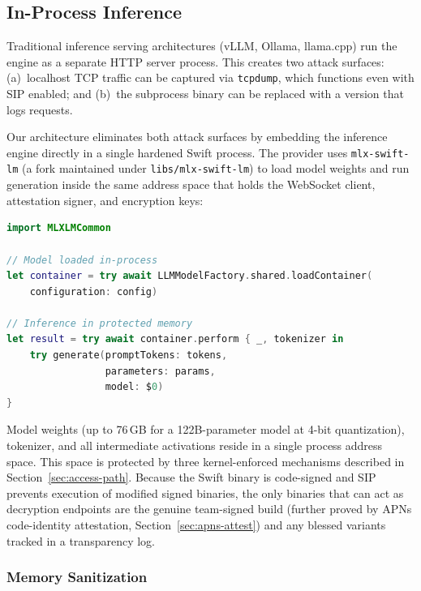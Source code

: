 \documentclass[10pt,twocolumn,letterpaper]{article}
\begin{document}
\subsection{In-Process Inference}
\label{sec:inprocess}

Traditional inference serving architectures (vLLM, Ollama, llama.cpp) run the engine as a separate HTTP server process. This creates two attack surfaces: (a)~localhost TCP traffic can be captured via \texttt{tcpdump}, which functions even with SIP enabled; and (b)~the subprocess binary can be replaced with a version that logs requests.

Our architecture eliminates both attack surfaces by embedding the inference engine directly in a single hardened Swift process. The provider uses \texttt{mlx-swift-lm} (a fork maintained under \texttt{libs/mlx-swift-lm}) to load model weights and run generation inside the same address space that holds the WebSocket client, attestation signer, and encryption keys:

\begin{lstlisting}[language=Swift,caption={Inference executes inside the hardened Swift process address space. No subprocess, HTTP server, socket, or pipe is created.}]
import MLXLMCommon

// Model loaded in-process
let container = try await LLMModelFactory.shared.loadContainer(
    configuration: config)

// Inference in protected memory
let result = try await container.perform { _, tokenizer in
    try generate(promptTokens: tokens,
                 parameters: params,
                 model: $0)
}
\end{lstlisting}

Model weights (up to 76\,GB for a 122B-parameter model at 4-bit quantization), tokenizer, and all intermediate activations reside in a single process address space. This space is protected by three kernel-enforced mechanisms described in Section~\ref{sec:access-path}. Because the Swift binary is code-signed and SIP prevents execution of modified signed binaries, the only binaries that can act as decryption endpoints are the genuine team-signed build (further proved by APNs code-identity attestation, Section~\ref{sec:apns-attest}) and any blessed variants tracked in a transparency log.

\subsubsection{Memory Sanitization}
\end{document}
